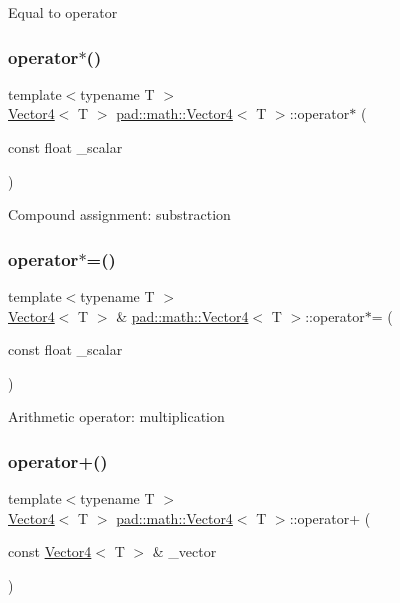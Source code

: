 Equal to operator \mbox{\label{structpad_1_1math_1_1_vector4_a57e32bb850ebd1b9ac4a6adf36ebfbe4}} 
\subsubsection{\texorpdfstring{operator$\ast$()}{operator*()}}
{\footnotesize\ttfamily template$<$typename T $>$ \\
\mbox{\hyperlink{structpad_1_1math_1_1_vector4}{Vector4}}$<$ T $>$ \mbox{\hyperlink{structpad_1_1math_1_1_vector4}{pad\+::math\+::\+Vector4}}$<$ T $>$\+::operator$\ast$ (\begin{DoxyParamCaption}\item[{const float}]{\+\_\+scalar }\end{DoxyParamCaption})}

Compound assignment\+: substraction \mbox{\label{structpad_1_1math_1_1_vector4_a33fee52eb7633acd92f85449d261b820}} 
\subsubsection{\texorpdfstring{operator$\ast$=()}{operator*=()}}
{\footnotesize\ttfamily template$<$typename T $>$ \\
\mbox{\hyperlink{structpad_1_1math_1_1_vector4}{Vector4}}$<$ T $>$ \& \mbox{\hyperlink{structpad_1_1math_1_1_vector4}{pad\+::math\+::\+Vector4}}$<$ T $>$\+::operator$\ast$= (\begin{DoxyParamCaption}\item[{const float}]{\+\_\+scalar }\end{DoxyParamCaption})}

Arithmetic operator\+: multiplication \mbox{\label{structpad_1_1math_1_1_vector4_ac6b2370ae62f75e3dcb112427e3f518f}} 
\subsubsection{\texorpdfstring{operator+()}{operator+()}}
{\footnotesize\ttfamily template$<$typename T $>$ \\
\mbox{\hyperlink{structpad_1_1math_1_1_vector4}{Vector4}}$<$ T $>$ \mbox{\hyperlink{structpad_1_1math_1_1_vector4}{pad\+::math\+::\+Vector4}}$<$ T $>$\+::operator+ (\begin{DoxyParamCaption}\item[{const \mbox{\hyperlink{structpad_1_1math_1_1_vector4}{Vector4}}$<$ T $>$ \&}]{\+\_\+vector }\end{DoxyParamCaption})}

